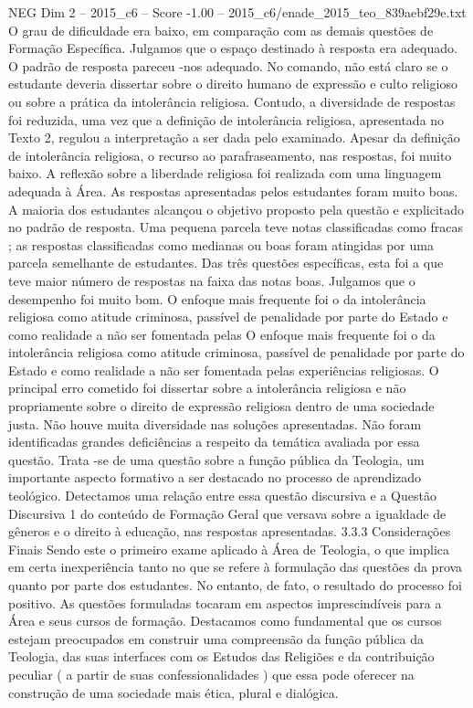 \begin{textsample}{NEG Dim 2 – 2015\_c6 – Score -1.00 – 2015\_c6/enade\_2015\_teo\_839aebf29e.txt}
O grau de dificuldade era baixo, em comparação com as demais questões de Formação Específica.
Julgamos que o espaço destinado à resposta era adequado.
O padrão de resposta pareceu -nos adequado.
No comando, não está claro se o estudante deveria dissertar sobre o direito humano de expressão e culto religioso ou sobre a prática da intolerância religiosa.
Contudo, a diversidade de respostas foi reduzida, uma vez que a definição de intolerância religiosa, apresentada no Texto 2, regulou a interpretação a ser dada pelo examinado.
Apesar da definição de intolerância religiosa, o recurso ao parafraseamento, nas respostas, foi muito baixo.
A reflexão sobre a liberdade religiosa foi realizada com uma linguagem adequada à Área.
As respostas apresentadas pelos estudantes foram muito boas.
A maioria dos estudantes alcançou o objetivo proposto pela questão e explicitado no padrão de resposta.
Uma pequena parcela teve notas classificadas como fracas ; as respostas classificadas como medianas ou boas foram atingidas por uma parcela semelhante de estudantes.
Das três questões específicas, esta foi a que teve maior número de respostas na faixa das notas boas.
Julgamos que o desempenho foi muito bom.
O enfoque mais frequente foi o da intolerância religiosa como atitude criminosa, passível de penalidade por parte do Estado e como realidade a não ser fomentada pelas O enfoque mais frequente foi o da intolerância religiosa como atitude criminosa, passível de penalidade por parte do Estado e como realidade a não ser fomentada pelas experiências religiosas.
O principal erro cometido foi dissertar sobre a intolerância religiosa e não propriamente sobre o direito de expressão religiosa dentro de uma sociedade justa.
Não houve muita diversidade nas soluções apresentadas.
Não foram identificadas grandes deficiências a respeito da temática avaliada por essa questão.
Trata -se de uma questão sobre a função pública da Teologia, um importante aspecto formativo a ser destacado no processo de aprendizado teológico.
Detectamos uma relação entre essa questão discursiva e a Questão Discursiva 1 do conteúdo de Formação Geral que versava sobre a igualdade de gêneros e o direito à educação, nas respostas apresentadas. 3.3.3 Considerações Finais Sendo este o primeiro exame aplicado à Área de Teologia, o que implica em certa inexperiência tanto no que se refere à formulação das questões da prova quanto por parte dos estudantes.
No entanto, de fato, o resultado do processo foi positivo.
As questões formuladas tocaram em aspectos imprescindíveis para a Área e seus cursos de formação.
Destacamos como fundamental que os cursos estejam preocupados em construir uma compreensão da função pública da Teologia, das suas interfaces com os Estudos das Religiões e da contribuição peculiar ( a partir de suas confessionalidades ) que essa pode oferecer na construção de uma sociedade mais ética, plural e dialógica.

\end{textsample}
